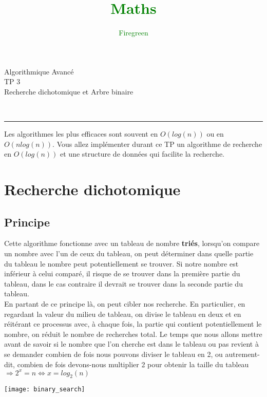 \documentclass[11pt]{extarticle}
\author{\textcolor{Green}{Firegreen}}
\title{\textcolor{Green}{\textbf{Maths}}}
\begin{document}
\begin{minipage}[t]{0.3\paperwidth}
\begin{flushleft}
\end{flushleft}
\end{minipage}
\begin{minipage}[t]{0.4\paperwidth}
\begin{flushright}
\noindent \Huge{Algorithmique Avancé} \\
\noindent \LARGE{TP 3} \\
\noindent \Large{Recherche dichotomique et Arbre binaire}
\end{flushright}
\end{minipage}\\
\begin{center}
\rule{\textwidth}{0.2cm}
\end{center}
Les algorithmes les plus efficaces sont souvent en $O(log(n))$ ou en $O(n log(n))$. Vous allez implémenter durant ce TP un algorithme de recherche en $O(log(n))$ et une structure de données qui facilite la recherche.
  
\section{Recherche dichotomique}
\subsection{Principe}
Cette algorithme fonctionne avec un tableau de nombre \textbf{triés}, lorsqu'on compare un nombre avec l'un de ceux du tableau, on peut déterminer dans quelle partie du tableau le nombre peut potentiellement se trouver. Si notre nombre est inférieur à celui comparé, il risque de se trouver dans la première partie du tableau, dans le cas contraire il devrait se trouver dans la seconde partie du tableau.\\
En partant de ce principe là, on peut cibler nos recherche. En particulier, en regardant la valeur du milieu de tableau, on divise le tableau en deux et en réitérant ce processus avec, à chaque fois, la partie qui contient potentiellement le nombre, on réduit le nombre de recherches total. Le temps que nous allons mettre avant de savoir si le nombre que l'on cherche est dans le tableau ou pas revient à se demander combien de fois nous pouvons diviser le tableau en 2, ou autrement-dit, combien de fois devons-nous multiplier 2 pour obtenir la taille du tableau $\Rightarrow 2^x = n \Leftrightarrow x = log_2(n)$
\begin{center}
\texttt{[image: binary\_search]}
\end{center}
\end{document}
